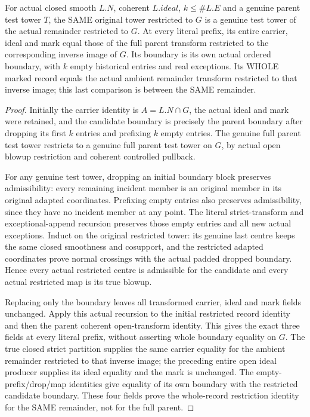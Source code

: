\begin{theorem}
\label{hir:zero-contact-remainder-restricted-test-tower}
\leanok
{}
For actual closed smooth $L.N$, coherent $L.ideal$, $k\leq\#L.E$ and a genuine
parent test tower $T$, the SAME original tower restricted to $G$ is a genuine
test tower of the actual remainder restricted to $G$. At every literal prefix,
its entire carrier, ideal and mark equal those of the full parent transform
restricted to the corresponding inverse image of $G$. Its boundary is its own
actual ordered boundary, with $k$ empty historical entries and real exceptions.
Its WHOLE marked record equals the actual ambient remainder transform restricted
to that inverse image; this last comparison is between the SAME remainder.
\end{theorem}
\begin{proof}
Initially the carrier identity is $A=L.N\cap G$, the actual ideal and mark
were retained, and the candidate boundary is precisely the parent boundary
after dropping its first $k$ entries and prefixing $k$ empty entries. The
genuine full parent test tower restricts to a genuine full parent test tower
on $G$, by actual open blowup restriction and coherent controlled pullback.

For any genuine test tower, dropping an initial boundary block preserves
admissibility: every remaining incident member is an original member in its
original adapted coordinates. Prefixing empty entries also preserves
admissibility, since they have no incident member at any point. The literal
strict-transform and exceptional-append recursion preserves those empty
entries and all new actual exceptions. Induct on the original restricted
tower: its genuine last centre keeps the same closed smoothness and cosupport,
and the restricted adapted coordinates prove normal crossings with the
actual padded dropped boundary. Hence every actual restricted centre is
admissible for the candidate and every actual restricted map is its true blowup.

Replacing only the boundary leaves all transformed carrier, ideal and mark
fields unchanged. Apply this actual recursion to the initial restricted
record identity and then the parent coherent open-transform identity. This
gives the exact three fields at every literal prefix, without asserting
whole boundary equality on $G$.
The true closed strict partition supplies the same carrier equality for the
ambient remainder restricted to that inverse image; the preceding entire open
ideal producer supplies its ideal equality and the mark is unchanged. The
empty-prefix/drop/map identities give equality of its own boundary with the
restricted candidate boundary. These four fields prove the whole-record
restriction identity for the SAME remainder, not for the full parent.
\end{proof}


